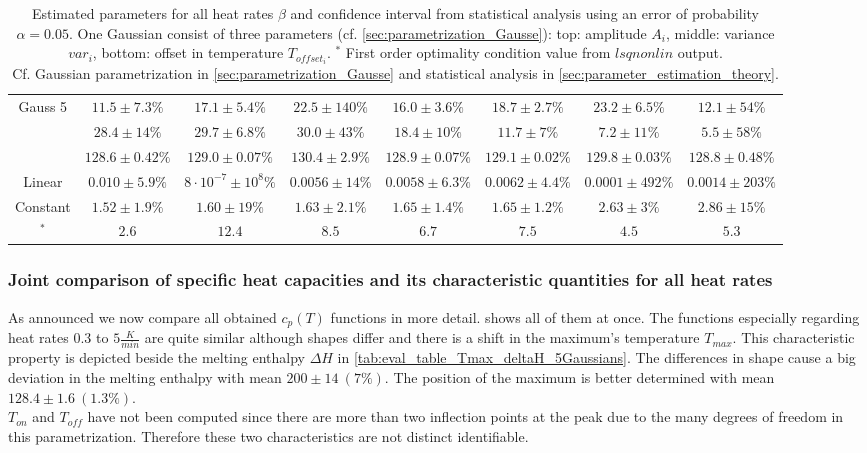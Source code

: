 \documentclass{scrartcl}[12pt, halfparskip]
\numberwithin{equation}{section}
\numberwithin{figure}{section}
\numberwithin{table}{section}
\begin{document}
\begin{landscape}
\begin{table}[H]
\begin{tabular}{| c | c | c | c | c | c | c | c |}
		Gauss 5 & $11.5 \pm 7.3\%$ & $17.1 \pm 5.4\%$ & $22.5 \pm 140\%$ & $16.0 \pm 3.6\%$ & $18.7 \pm 2.7\%$ & $23.2 \pm 6.5\%$ & $12.1 \pm 54\%$ \\
		& $28.4 \pm 14\%$ & $29.7 \pm 6.8\%$ & $30.0 \pm 43\%$ & $18.4 \pm 10\%$ & $11.7 \pm 7\%$ & $7.2 \pm 11\%$ & $5.5 \pm 58\%$ \\
		& $128.6 \pm 0.42\%$ & $129.0 \pm 0.07\%$ & $130.4 \pm 2.9\%$ & $128.9 \pm 0.07\%$ & $129.1 \pm 0.02\%$ & $129.8 \pm 0.03\%$ & $128.8 \pm 0.48\%$ \\ \hline
		Linear & $0.010 \pm 5.9\%$ & $8 \cdot 10^{-7} \pm 10^8\%$ & $0.0056 \pm 14\%$ & $0.0058 \pm 6.3\%$ & $0.0062 \pm 4.4\%$ & $0.0001 \pm 492\%$ & $0.0014 \pm 203\%$ \\
		Constant & $1.52 \pm 1.9\%$ & $1.60 \pm 19\%$ & $1.63 \pm 2.1\%$ & $1.65 \pm 1.4\%$ & $1.65 \pm 1.2\%$ & $2.63 \pm 3\%$ & $2.86 \pm 15\%$ \\ \hline \hline
		[NOC1]$^*$ & $2.6$ & $12.4$ & $8.5$ & $6.7$ & $7.5$ & $4.5$ & $5.3$ \\ \hline
	\end{tabular}
	\caption{Estimated parameters for all heat rates $\beta$ and confidence interval from statistical analysis using an error of probability $\alpha=0.05$. One Gaussian consist of three parameters (cf. \cref{sec:parametrization_Gausse}): top: amplitude $A_i$, middle: variance $var_i$, bottom: offset in temperature $T_{offset_i}$. $^*$ First order optimality condition value from $lsqnonlin$ output. \\
	Cf. Gaussian parametrization in \cref{sec:parametrization_Gausse} and statistical analysis in \cref{sec:parameter_estimation_theory}.}
	\label{tab:parameter_table_5Gaussians}
\end{table}

\end{landscape}
\newpage

\subsubsection{Joint comparison of specific heat capacities and its characteristic quantities for all heat rates}

As announced we now compare all obtained $c_p(T)$ functions in more detail.  shows all of them at once. The functions especially regarding heat rates $0.3$ to $5 \frac{K}{min}$ are quite similar although shapes differ and there is a shift in the maximum's temperature $T_{max}$. This characteristic property is depicted beside the melting enthalpy $\Delta H$ in \cref{tab:eval_table_Tmax_deltaH_5Gaussians}. The differences in shape cause a big deviation in the melting enthalpy with mean $200 \pm 14 \ (7\%)$. The position of the maximum is better determined with mean $128.4 \pm 1.6 \ (1.3\%)$. \\
$T_{on}$ and $T_{off}$ have not been computed since there are more than two inflection points at the peak due to the many degrees of freedom in this parametrization. Therefore these two characteristics are not distinct identifiable.
\end{document}
